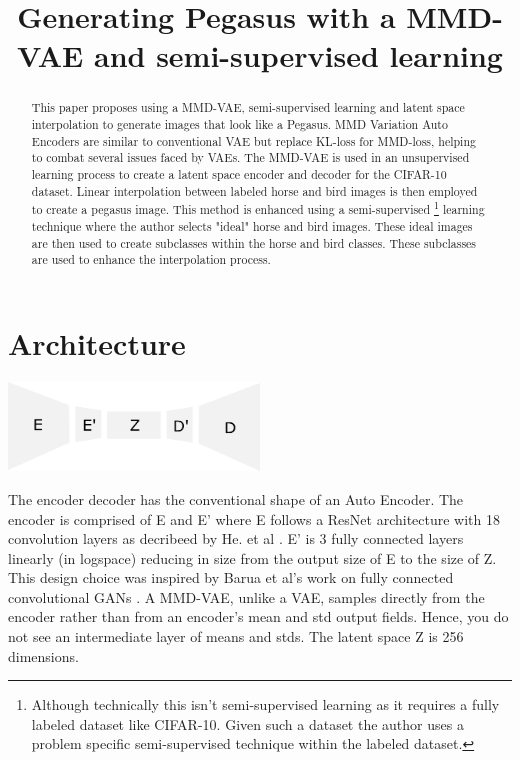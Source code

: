 \documentclass{article}
\title{Generating Pegasus with a MMD-VAE and semi-supervised learning}
\begin{document}
\maketitle
\begin{abstract}
    This paper proposes using a MMD-VAE, semi-supervised learning and latent space interpolation to generate images that look like a Pegasus. MMD Variation Auto Encoders are similar to conventional VAE but replace KL-loss for MMD-loss, helping to combat several issues faced by VAEs. The MMD-VAE is used in an unsupervised learning process to create a latent space encoder and decoder for the CIFAR-10 dataset. Linear interpolation between labeled horse and bird images is then employed to create a pegasus image. This method is enhanced using a semi-supervised \footnote{Although technically this isn't semi-supervised learning as it requires a fully labeled dataset like CIFAR-10. Given such a dataset the author uses a problem specific semi-supervised technique within the labeled dataset.} learning technique where the author selects "ideal" horse and bird images. These ideal images are then used to create subclasses within the horse and bird classes. These subclasses are used to enhance the interpolation process.

\end{abstract}

\section{Architecture}
\begin{center}
    \includegraphics[width=0.5\textwidth]{figures/Encoder.png}
\end{center}
The encoder decoder has the conventional shape of an Auto Encoder.
The encoder is comprised of E and E' where E follows a ResNet architecture with 18 convolution layers as decribeed by He. et al \cite{ResNet}. E' is 3 fully connected layers linearly (in logspace) reducing in size from the output size of E to the size of Z. This design choice was inspired by Barua et al's work on fully connected convolutional GANs \cite{fccGAN}. A MMD-VAE, unlike a VAE, samples directly from the encoder rather than from an encoder's mean and std output fields. Hence, you do not see an intermediate layer of means and stds. The latent space Z is 256 dimensions. 
\end{document}
